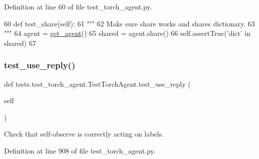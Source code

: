 Definition at line 60 of file test\+\_\+torch\+\_\+agent.\+py.


\begin{DoxyCode}
60     \textcolor{keyword}{def }test\_share(self):
61         \textcolor{stringliteral}{"""}
62 \textcolor{stringliteral}{        Make sure share works and shares dictionary.}
63 \textcolor{stringliteral}{        """}
64         agent = \hyperlink{namespacetests_1_1test__torch__agent_ae929d109305aaea29fbfa13ecf1f32e9}{get\_agent}()
65         shared = agent.share()
66         self.assertTrue(\textcolor{stringliteral}{'dict'} \textcolor{keywordflow}{in} shared)
67 
\end{DoxyCode}
\mbox{\label{classtests_1_1test__torch__agent_1_1TestTorchAgent_a10ba6e3fdb49b540bc4663d9c7a30eab}} 
\subsubsection{\texorpdfstring{test\+\_\+use\+\_\+reply()}{test\_use\_reply()}}
{\footnotesize\ttfamily def tests.\+test\+\_\+torch\+\_\+agent.\+Test\+Torch\+Agent.\+test\+\_\+use\+\_\+reply (\begin{DoxyParamCaption}\item[{}]{self }\end{DoxyParamCaption})}

\begin{DoxyVerb}Check that self-observe is correctly acting on labels.
\end{DoxyVerb}
 

Definition at line 908 of file test\+\_\+torch\+\_\+agent.\+py.



